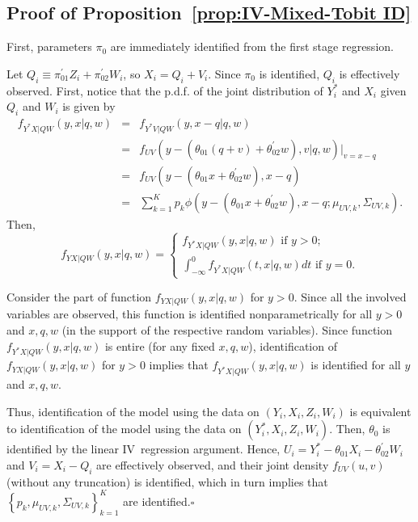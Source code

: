 \documentclass[12pt]{article}
\begin{document}
\begin{appendices}
\bigskip

\subsection{Proof of Proposition~\protect\ref{prop:IV-Mixed-Tobit ID}}

First, parameters $\pi _{0}$ are immediately identified from the first stage
regression.

Let $Q_{i}\equiv \pi _{01}^{\prime }Z_{i}+\pi _{02}^{\prime }W_{i}$, so $%
X_{i}=Q_{i}+V_{i}$. Since $\pi_0$ is identified, $Q_i$ is effectively
observed. First, notice that the p.d.f. of the joint distribution of $Y_i^*$
and $X_i$ given $Q_i$ and $W_i$ is given by 
\begin{eqnarray*}
f_{Y^{\ast }X|QW}\left( y,x|q,w\right) &=&f_{Y^*V|QW}\left( y,x-q|q,w\right)
\\
&=&f_{UV}\left( y-\left( \theta _{01}\left( q+v\right) +\theta _{02}^{\prime
}w\right) ,v|q,w\right) |_{v=x-q} \\
&=&f_{UV}\left( y-\left( \theta _{01}x+\theta _{02}^{\prime }w\right)
,x-q\right) \\
&=&\sum_{k=1}^{K}p_{k}\phi (y-\left( \theta _{01}x+\theta _{02}^{\prime
}w\right) ,x-q;\mu _{UV,k},\Sigma _{UV,k}).
\end{eqnarray*}%
Then,%
\begin{equation*}
f_{YX|QW}\left( y,x|q,w\right) =\left\{ 
\begin{array}{c}
f_{Y^{\ast }X|QW}\left( y,x|q,w\right) \text{ if }y>0; \\ 
\int_{-\infty }^{0}f_{Y^{\ast }X|QW}\left( t,x|q,w\right) dt\text{ if }y=0.%
\end{array}%
\right.
\end{equation*}

Consider the part of function $f_{YX|QW}\left( y,x|q,w\right) $ for $y>0$.
Since all the involved variables are observed, this function is identified
nonparametrically for all $y>0$ and $x,q,w$ (in the support of the
respective random variables). Since function $f_{Y^{\ast }X|QW}\left(
y,x|q,w\right) $ is entire (for any fixed $x,q,w$), identification of $%
f_{YX|QW}\left( y,x|q,w\right) $ for $y>0$ implies that $f_{Y^{\ast
}X|QW}\left( y,x|q,w\right) $ is identified for all $y$ and $x,q,w$.

Thus, identification of the model using the data on $\left(
Y_{i},X_{i},Z_{i},W_{i}\right) $ is equivalent to identification of the
model using the data on $\left( Y_{i}^{\ast },X_{i},Z_{i},W_{i}\right) $.
Then, $\theta _{0}$ is identified by the linear IV\ regression argument.
Hence, $U_i = Y_i^* - \theta_{01} X_i - \theta_{02}^{\prime }W_i$ and $V_i =
X_i - Q_i$ are effectively observed, and their joint density $f_{UV}\left(
u,v\right) $ (without any truncation) is identified, which in turn implies
that $\left\{ p_{k},\mu _{UV,k},\Sigma _{UV,k}\right\} _{k=1}^{K}$ are
identified.\hfill $\square $


\end{appendices}
\end{document}
